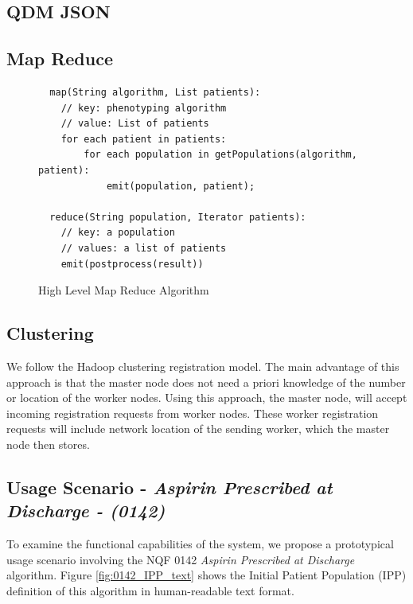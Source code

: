 \documentclass{amia}
\begin{document}
\subsection*{QDM JSON}

\subsection*{Map Reduce}

\begin{figure}[H]
\begin{verbatim}
  map(String algorithm, List patients):
    // key: phenotyping algorithm
    // value: List of patients
    for each patient in patients:
        for each population in getPopulations(algorithm, patient):
            emit(population, patient);

  reduce(String population, Iterator patients):
    // key: a population
    // values: a list of patients
    emit(postprocess(result))
\end{verbatim}
\caption{High Level Map Reduce Algorithm} 
\label{fig:map_reduce}
\end{figure}

\subsection*{Clustering}

We follow the Hadoop clustering registration model\cite{wang2009hadoop}. The main advantage of this approach is that the master node does not need a priori knowledge of the number or location of the worker nodes. Using this approach, the master node, will accept incoming registration requests from worker nodes. These worker registration requests will include network location of the sending worker, which the master node then stores.


\subsection*{Usage Scenario - \textit{Aspirin Prescribed at Discharge - (0142)}}
To examine the functional capabilities of the system, we propose a prototypical usage scenario involving the NQF 0142 \textit{Aspirin Prescribed at Discharge} algorithm. Figure \ref{fig:0142_IPP_text} shows the Initial Patient Population (IPP) definition of this algorithm in human-readable text format.
\end{document}
